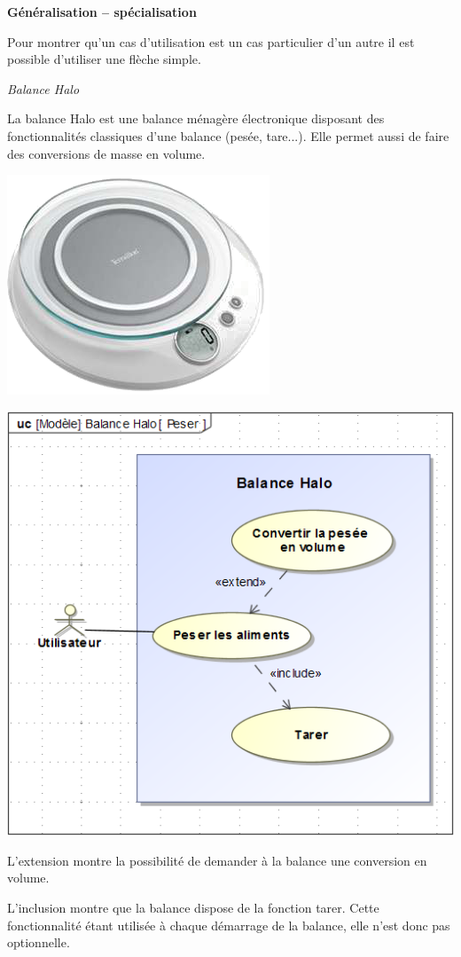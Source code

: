 \documentclass[11pt,oneside]{article}
\begin{document}
\begin{defi}
\textbf{Généralisation -- spécialisation}

Pour montrer qu'un cas d'utilisation est un cas particulier d'un autre il est possible d'utiliser une flèche simple. 

\end{defi}

\begin{exemple}
\textit{Balance Halo}

La balance Halo est une balance ménagère électronique disposant des fonctionnalités classiques d'une balance (pesée, tare...). Elle permet aussi de faire des conversions de masse en volume. 
\begin{minipage}[c]{.3\textwidth}
\begin{center}
\includegraphics[width=.6\textwidth]{png/balanceHalo_2}
\end{center}
\end{minipage}\hfill
\begin{minipage}[c]{.65\textwidth}
\begin{center}
\includegraphics[width=.7\textwidth]{png/balanceHalo}
\end{center}
\end{minipage}

L'extension montre la possibilité de demander à la balance une conversion en volume. 

L'inclusion montre que la balance dispose de la fonction tarer. Cette fonctionnalité étant utilisée à chaque démarrage de la balance, elle n'est donc pas optionnelle.
\end{exemple}
\end{document}
